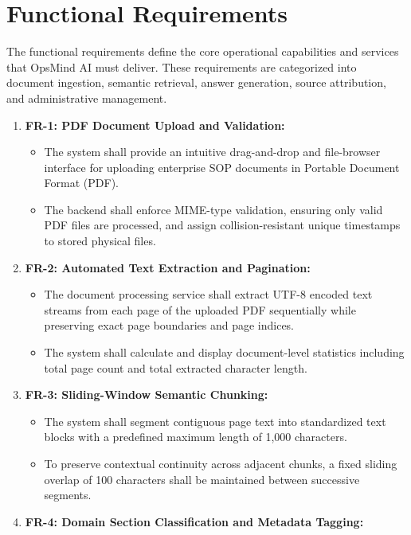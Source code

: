 \section{Functional Requirements}
\label{sec:req_functional}

The functional requirements define the core operational capabilities and services that OpsMind AI must deliver. These requirements are categorized into document ingestion, semantic retrieval, answer generation, source attribution, and administrative management.

\begin{enumerate}
    \item \textbf{FR-1: PDF Document Upload and Validation:}
    \begin{itemize}
        \item The system shall provide an intuitive drag-and-drop and file-browser interface for uploading enterprise SOP documents in Portable Document Format (PDF).
        \item The backend shall enforce MIME-type validation, ensuring only valid PDF files are processed, and assign collision-resistant unique timestamps to stored physical files.
    \end{itemize}
    \item \textbf{FR-2: Automated Text Extraction and Pagination:}
    \begin{itemize}
        \item The document processing service shall extract UTF-8 encoded text streams from each page of the uploaded PDF sequentially while preserving exact page boundaries and page indices.
        \item The system shall calculate and display document-level statistics including total page count and total extracted character length.
    \end{itemize}
    \item \textbf{FR-3: Sliding-Window Semantic Chunking:}
    \begin{itemize}
        \item The system shall segment contiguous page text into standardized text blocks with a predefined maximum length of 1,000 characters.
        \item To preserve contextual continuity across adjacent chunks, a fixed sliding overlap of 100 characters shall be maintained between successive segments.
    \end{itemize}
    \item \textbf{FR-4: Domain Section Classification and Metadata Tagging:}

\end{enumerate}
